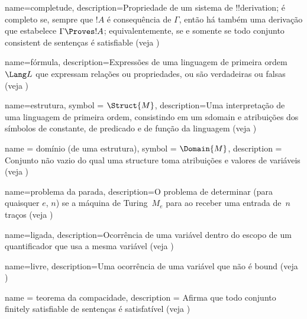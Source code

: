  {
  name=completude, 
  description={Propriedade de um sistema de !!{derivation}; é completo se, sempre que
    $!A$ é consequência de $\Gamma$, então há também uma {derivação} que
    estabelece $\Gamma \Proves !A$; equivalentemente, se e somente se
    todo conjunto \gls{consistent} de sentenças é \gls{satisfiable}
    (veja )} }

 {
  name={fórmula},  
  description={Expressões de uma linguagem de primeira ordem~$\Lang L$ que
    expressam relações ou propriedades, ou são verdadeiras ou falsas (veja
    )} }

 {
  name={estrutura},
  symbol = {\ensuremath{\Struct{M}}},
  description={Uma interpretação de uma linguagem de primeira ordem, consistindo
    em um \gls{sdomain} e atribuições dos símbolos de constante,
    de predicado e de função da linguagem (veja
    )} }

 {
  name = {domínio (de uma estrutura)},
  symbol = {\ensuremath{\Domain{M}}},
  description = {Conjunto não vazio do qual uma \gls{structure} toma
    atribuições e valores de {variáveis} (veja
    )} }
 
 {
  name=problema da parada,
  description={O problema de determinar (para quaisquer $e$, $n$) se
    a máquina de Turing~$M_e$ para ao receber uma entrada de~$n$ traços (veja
    )} }

 {
  name=ligada,
  description={Ocorrência de uma variável
    dentro do escopo de um quantificador que usa a mesma
    variável (veja )}
}

 {
  name=livre,
    description={Uma ocorrência de uma variável que não é \gls{bound}
    (veja )}
}

 {
  name = {teorema da compacidade},  
  description = {Afirma que todo conjunto \gls{finitely satisfiable} de
    sentenças é satisfatível (veja
    )}}






